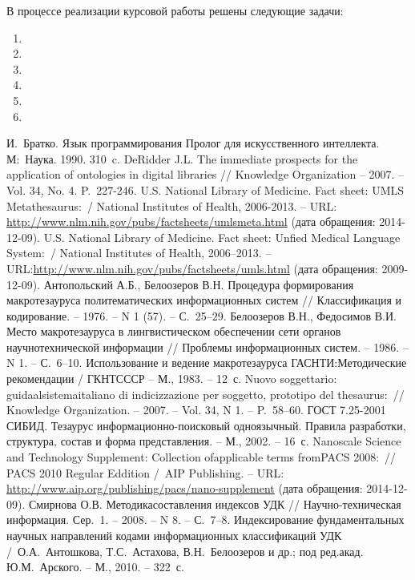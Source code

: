\documentclass{studrep}
\begin{document}
В процессе реализации курсовой работы решены следующие задачи:
\begin{enumerate}
\item
\item
\item
\item
\item
\item
\end{enumerate}

\begin{thebibliography}{99}
 И.~Братко. Язык программирования Пролог для искусственного интеллекта. М\;:~Наука. 1990. 310~c.
 DeRidder J.L. The immediate prospects for the application of ontologies in digital libraries // Knowledge Organization -- 2007. -- Vol. 34, No. 4. P.~227-246.
  U.S. National Library of Medicine. Fact sheet: UMLS Metathesaurus\;:\;[текст]~/ National Institutes of Health, 2006-2013. -- URL:
\url{http://www.nlm.nih.gov/pubs/factsheets/umlsmeta.html} (дата обращения: 2014-12-09).
  U.S. National Library of Medicine. Fact sheet: Unfied Medical Language System\;:\;[текст]~/ National Institutes of Health, 2006--2013. -- URL:\url{http://www.nlm.nih.gov/pubs/factsheets/umls.html} (дата обращения: 2009-12-09).
  Антопольский А.Б., Белоозеров В.Н. Процедура формирования макротезауруса политематических информационных систем // Классификация и кодирование. -- 1976. -- N 1 (57). -- С.~25--29.
  Белоозеров В.Н., Федосимов В.И. Место макротезауруса в лингвистическом обеспечении сети органов научнотехнической информации // Проблемы информационных систем. -- 1986. -- N 1. -- С.~6--10.
  Использование и ведение макротезауруса ГАСНТИ:Методические рекомендации / ГКНТСССР -- М., 1983. -- 12~с.
  Nuovo soggettario: guidaalsistemaitaliano di indicizzazione per soggetto, prototipo del thesaurus\;:\;[рецензия]~// Knowledge Organization. -- 2007. -- Vol. 34, N 1. -- P.~58--60.
  ГОСТ 7.25-2001 СИБИД. Тезаурус информационно-поисковый одноязычный. Правила разработки, структура, состав и форма представления. -- М., 2002. -- 16~с.
  Nanoscale Science and Technology Supplement: Collection ofapplicable terms fromPACS 2008\;:\;[текст]~// PACS 2010 Regular Eddition /~AIP Publishing. -- URL: \url{http://www.aip.org/publishing/pacs/nano-supplement} (дата обращения: 2014-12-09).
  Смирнова О.В. Методикасоставления индексов УДК // Научно-техническая информация. Сер.~1. -- 2008. -- N 8. -- С.~7--8.
  Индексирование фундаментальных научных направлений кодами информационных классификаций УДК /~О.А.~Антошкова, Т.С.~Астахова, В.Н.~Белоозеров и др.; под ред.акад. Ю.М.~Арского. -- М., 2010. -- 322~с.

\end{thebibliography}
\end{document}
